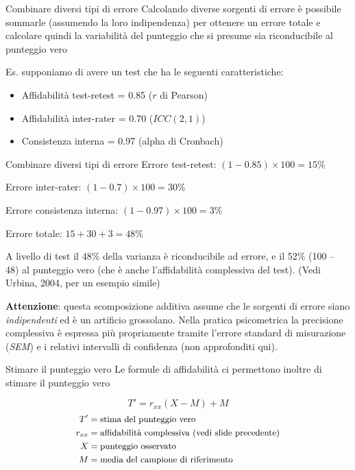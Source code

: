 \documentclass[
  ignorenonframetext,
  aspectratio=169,
]{beamer}
\providecommand{\tightlist}{%
  \setlength{\itemsep}{0pt}\setlength{\parskip}{0pt}}
\begin{document}
\begin{frame}{Combinare diversi tipi di errore}
\label{combinare-diversi-tipi-di-errore}
Calcolando diverse sorgenti di errore è possibile sommarle (assumendo la
loro indipendenza) per ottenere un errore totale e calcolare quindi la
variabilità del punteggio che si presume sia riconducibile al punteggio
vero

Es. supponiamo di avere un test che ha le seguenti caratteristiche:

\begin{itemize}
\tightlist
\item
  Affidabilità test-retest = 0.85 (\(r\) di Pearson)
\item
  Affidabilità inter-rater = 0.70 (\(ICC(2,1)\))
\item
  Consistenza interna = 0.97 (alpha di Cronbach)
\end{itemize}
\end{frame}

\begin{frame}{Combinare diversi tipi di errore}
\label{combinare-diversi-tipi-di-errore-1}
Errore test-retest: \((1-0.85) \times 100 = 15\%\)

Errore inter-rater: \((1-0.7) \times 100 = 30\%\)

Errore consistenza interna: \((1-0.97) \times 100 = 3\%\)

Errore totale: \(15 + 30 + 3 = 48\%\) \vspace{1em}

A livello di test il 48\% della varianza è riconducibile ad errore, e il
52\% (100 -- 48) al punteggio vero (che è anche l'affidabilità
complessiva del test). (Vedi Urbina, 2004, per un esempio simile)

\vspace{0.5em}

\footnotesize \textbf{Attenzione}: questa scomposizione additiva assume
che le sorgenti di errore siano \emph{indipendenti} ed è un artificio
grossolano. Nella pratica psicometrica la precisione complessiva è
espressa più propriamente tramite l'errore standard di misurazione
(\emph{SEM}) e i relativi intervalli di confidenza (non approfonditi
qui).
\end{frame}

\begin{frame}{Stimare il punteggio vero}
\label{stimare-il-punteggio-vero}
Le formule di affidabilità ci permettono inoltre di stimare il punteggio
vero

\[
T'=r_{xx}(X-M)+M
\] \[
\small
\begin{aligned}
T' & = \text{stima del punteggio vero} \\
r_{xx} & = \text{affidabilità complessiva (vedi slide precedente)} \\
X & = \text{punteggio osservato} \\
M & = \text{media del campione di riferimento} \\
\end{aligned}
\]
\end{frame}
\end{document}
